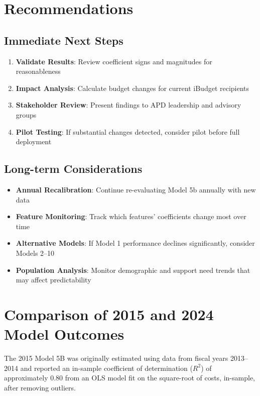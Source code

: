 \section{Recommendations}

\subsection{Immediate Next Steps}

\begin{enumerate}
    \item \textbf{Validate Results}: Review coefficient signs and magnitudes for reasonableness
    \item \textbf{Impact Analysis}: Calculate budget changes for current iBudget recipients
    \item \textbf{Stakeholder Review}: Present findings to APD leadership and advisory groups
    \item \textbf{Pilot Testing}: If substantial changes detected, consider pilot before full deployment
\end{enumerate}

\subsection{Long-term Considerations}

\begin{itemize}
    \item \textbf{Annual Recalibration}: Continue re-evaluating Model 5b annually with new data
    \item \textbf{Feature Monitoring}: Track which features' coefficients change most over time
    \item \textbf{Alternative Models}: If Model 1 performance declines significantly, consider Models 2--10
    \item \textbf{Population Analysis}: Monitor demographic and support need trends that may affect predictability
\end{itemize}


 \section{Comparison of 2015 and 2024 Model Outcomes}

The 2015 Model 5B was originally estimated using data from fiscal years 2013--2014 and reported an in-sample coefficient of determination ($R^2$) of approximately 0.80 from an OLS model fit on the square-root of costs, in-sample, after removing outliers.  

